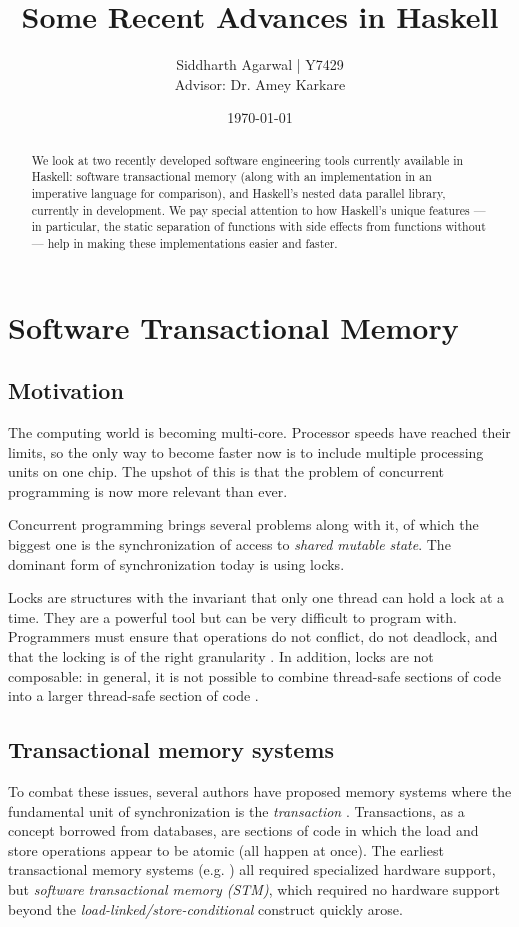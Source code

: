 \documentclass[a4paper]{acmtrans2m}
\title{Some Recent Advances in Haskell}
\author{Siddharth Agarwal | Y7429\\
  Advisor: Dr. Amey Karkare}
\date{\today}
\begin{document}
\maketitle

\tableofcontents

\begin{abstract}
We look at two recently developed software engineering tools currently available
in Haskell: software transactional memory (along with an implementation in an
imperative language for comparison), and Haskell's nested data parallel library,
currently in development. We pay special attention to how Haskell's unique
features --- in particular, the static separation of functions with side effects
from functions without --- help in making these implementations easier and
faster.
\end{abstract}

\section{Software Transactional Memory}

\subsection{Motivation}

The computing world is becoming multi-core. Processor speeds have reached their
limits, so the only way to become faster now is to include multiple processing
units on one chip. The upshot of this is that the problem of concurrent
programming is now more relevant than ever.

Concurrent programming brings several problems along with it, of which the
biggest one is the synchronization of access to \textit{shared mutable
  state}. The dominant form of synchronization today is using locks.

Locks are structures with the invariant that only one thread can hold a lock at
a time. They are a powerful tool but can be very difficult to program
with. Programmers must ensure that operations do not conflict, do not deadlock,
and that the locking is of the right granularity \cite{Duffy:2010}. In addition,
locks are not composable: in general, it is not possible to combine thread-safe
sections of code into a larger thread-safe section of code \cite{Harris:2005}.

\subsection{Transactional memory systems}
To combat these issues, several authors have proposed memory systems where the
fundamental unit of synchronization is the \textit{transaction}
\cite{Harris:2007}. Transactions, as a concept borrowed from databases, are
sections of code in which the load and store operations appear to be atomic (all
happen at once). The earliest transactional memory systems
(e.g. \cite{Herlihy:1993}) all required specialized hardware support, but
\textit{software transactional memory (STM)}, which required no hardware support
beyond the \textit{load-linked/store-conditional} construct \cite{Shavit:1995}
quickly arose.
\end{document}
